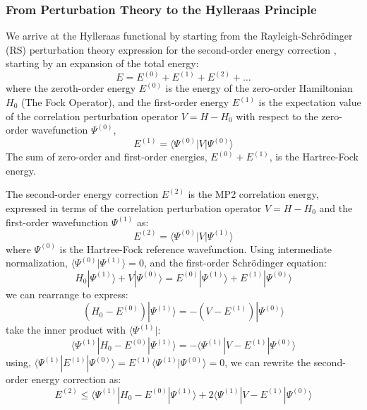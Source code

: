\subsubsection{From Perturbation Theory to the Hylleraas Principle}
We arrive at the Hylleraas functional by starting from the Rayleigh-Schrödinger (RS) perturbation theory expression for the second-order energy correction \cite{Helgaker2000}, starting by an expansion of the total energy:
\begin{equation}
E = E^{(0)} + E^{(1)} + E^{(2)} + \ldots
\end{equation}
where the zeroth-order energy $E^{(0)}$ is the energy of the zero-order Hamiltonian $H_0$ (The Fock Operator), and the first-order energy $E^{(1)}$ is the expectation value of the correlation perturbation operator $V = H - H_0$ with respect to the zero-order wavefunction $\Psi^{(0)}$,
\begin{equation}
    E^{(1)} = \langle\Psi^{(0)}|V|\Psi^{(0)}\rangle
\end{equation}
The sum of zero-order and first-order energies, $E^{(0)} + E^{(1)}$, is the Hartree-Fock energy. 

The second-order energy correction $E^{(2)}$ is the MP2 correlation energy, expressed in terms of the correlation perturbation operator $V = H - H_0$ and the first-order wavefunction $\Psi^{(1)}$ as:
\begin{equation}
E^{(2)} = \langle\Psi^{(0)}|V|\Psi^{(1)}\rangle
\end{equation}
where $\Psi^{(0)}$ is the Hartree-Fock reference wavefunction. Using intermediate normalization, $\langle\Psi^{(0)}|\Psi^{(1)}\rangle = 0$, and the first-order Schrödinger equation:
\begin{equation}
    H_0 |\Psi^{(1)}\rangle + V|\Psi^{(0)}\rangle = E^{(0)}|\Psi^{(1)}\rangle + E^{(1)}|\Psi^{(0)}\rangle
\end{equation}
we can rearrange to express:
\begin{equation}
    (H_0 - E^{(0)})|\Psi^{(1)}\rangle = -(V - E^{(1)})|\Psi^{(0)}\rangle
\end{equation}
take the inner product with $\langle\Psi^{(1)}|$:
\begin{equation}
    \langle\Psi^{(1)}|H_0 - E^{(0)}|\Psi^{(1)}\rangle = -\langle\Psi^{(1)}|V - E^{(1)}|\Psi^{(0)}\rangle
\end{equation}
using, $\langle\Psi^{(1)}|E^{(1)}|\Psi^{(0)}\rangle = E^{(1)}\langle\Psi^{(1)}|\Psi^{(0)}\rangle = 0$, we can rewrite the second-order energy correction as:
\begin{equation}
    E^{(2)} \leq \langle\Psi^{(1)}|H_0 - E^{(0)}|\Psi^{(1)}\rangle + 2\langle\Psi^{(1)}|V - E^{(1)}|\Psi^{(0)}\rangle
\end{equation}

